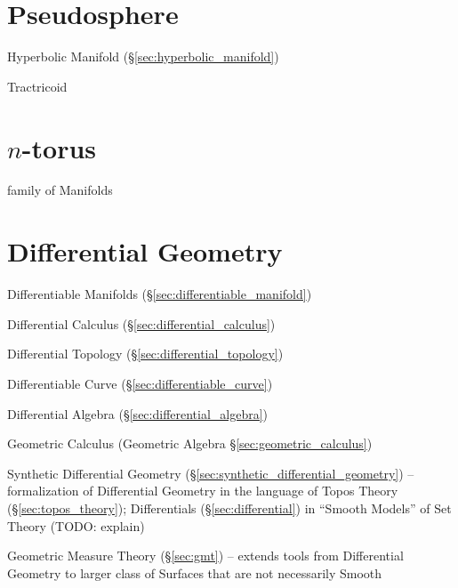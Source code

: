 \section{Pseudosphere}\label{sec:pseudosphere}

Hyperbolic Manifold (\S\ref{sec:hyperbolic_manifold})

Tractricoid



\section{$n$-torus}\label{sec:n_torus}

family of Manifolds



\section{Differential Geometry}\label{sec:differential_geometry}

Differentiable Manifolds (\S\ref{sec:differentiable_manifold})

\fist Differential Calculus (\S\ref{sec:differential_calculus})

\fist Differential Topology (\S\ref{sec:differential_topology})

\fist Differentiable Curve (\S\ref{sec:differentiable_curve})

\fist Differential Algebra (\S\ref{sec:differential_algebra})

\fist Geometric Calculus (Geometric Algebra \S\ref{sec:geometric_calculus})

\fist Synthetic Differential Geometry
(\S\ref{sec:synthetic_differential_geometry}) -- formalization of Differential
Geometry in the language of Topos Theory (\S\ref{sec:topos_theory});
Differentials (\S\ref{sec:differential}) in ``Smooth Models'' of Set Theory
(TODO: explain)

\fist Geometric Measure Theory (\S\ref{sec:gmt}) -- extends tools from
Differential Geometry to larger class of Surfaces that are not necessarily
Smooth



